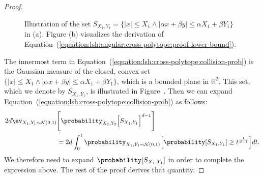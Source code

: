 \begin{proof}
    \begin{figure}[t]
        \centering
        \caption{Illustration of the set $S_{X_1, Y_1} = \{ \lvert x \rvert \leq X_1 \land \lvert \alpha x + \beta y \rvert \leq \alpha X_1 + \beta Y_1 \}$ in (a). Figure (b) visualizes the derivation of Equation~(\ref{equation:lsh:angular:cross-polytope:proof-lower-bound}).}
        \label{figure:lsh:angular:cross-polytope:proof}
    \end{figure}

    The innermost term in Equation~(\ref{equation:lsh:cross-polytope:collision-prob}) is
    the Gaussian measure of the closed, convex set
    $\{ \lvert x \rvert \leq X_1 \land \lvert \alpha x + \beta y \rvert \leq \alpha X_1 + \beta Y_1 \}$,
    which is a bounded plane in $\mathbb{R}^2$. This set, which we denote by $S_{X_1, Y_1}$,
    is illustrated in Figure~.
    Then we can expand Equation~(\ref{equation:lsh:cross-polytope:collision-prob}) as follows:
    \begin{align}
        \label{equation:lsh:angular:cross-polytope:prob-collision-expanded}
        2d \ev_{X_1, Y_1 \sim \mathcal{N}(0, 1)} &\Bigg[ 
            \probability_{X_2, Y_2}\Big[ S_{X_1, Y_1} \Big]^{d-1}
        \Bigg] \\
        &= 2d \int_0^1 \probability_{X_1, Y_1 \sim \mathcal{N}(0, 1)} \Big[ \probability [ S_{X_1, Y_1} ] \geq t^{\frac{1}{d - 1}} \Big] dt.
    \end{align}
    We therefore need to expand $\probability[S_{X_1, Y_1}]$ in order to complete the expression above.
    The rest of the proof derives that quantity.
    

\end{proof}

